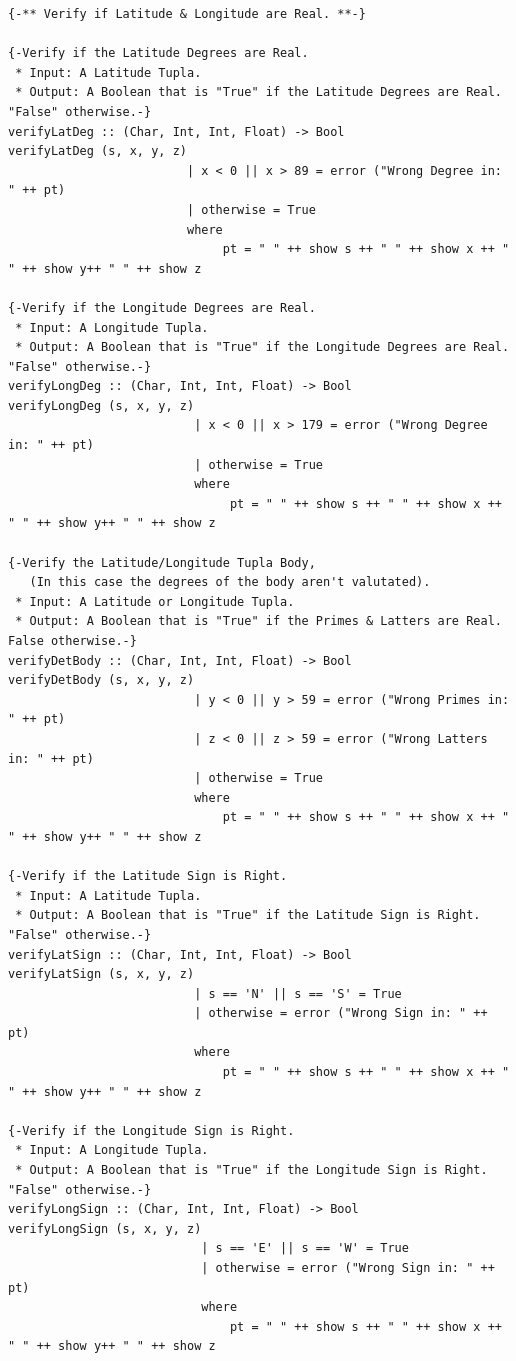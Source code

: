 \documentclass{article}
\begin{document}
\begin{lstlisting}
{-** Verify if Latitude & Longitude are Real. **-}

{-Verify if the Latitude Degrees are Real.
 * Input: A Latitude Tupla.
 * Output: A Boolean that is "True" if the Latitude Degrees are Real. "False" otherwise.-}
verifyLatDeg :: (Char, Int, Int, Float) -> Bool 
verifyLatDeg (s, x, y, z)
                         | x < 0 || x > 89 = error ("Wrong Degree in: " ++ pt)
                         | otherwise = True
                         where
                              pt = " " ++ show s ++ " " ++ show x ++ " " ++ show y++ " " ++ show z

{-Verify if the Longitude Degrees are Real.
 * Input: A Longitude Tupla.
 * Output: A Boolean that is "True" if the Longitude Degrees are Real. "False" otherwise.-}
verifyLongDeg :: (Char, Int, Int, Float) -> Bool 
verifyLongDeg (s, x, y, z)
                          | x < 0 || x > 179 = error ("Wrong Degree in: " ++ pt)
                          | otherwise = True
                          where
                               pt = " " ++ show s ++ " " ++ show x ++ " " ++ show y++ " " ++ show z

{-Verify the Latitude/Longitude Tupla Body,
   (In this case the degrees of the body aren't valutated).
 * Input: A Latitude or Longitude Tupla.
 * Output: A Boolean that is "True" if the Primes & Latters are Real. False otherwise.-}
verifyDetBody :: (Char, Int, Int, Float) -> Bool
verifyDetBody (s, x, y, z)
                          | y < 0 || y > 59 = error ("Wrong Primes in: " ++ pt)
                          | z < 0 || z > 59 = error ("Wrong Latters in: " ++ pt)
                          | otherwise = True 
                          where
                              pt = " " ++ show s ++ " " ++ show x ++ " " ++ show y++ " " ++ show z

{-Verify if the Latitude Sign is Right.
 * Input: A Latitude Tupla.
 * Output: A Boolean that is "True" if the Latitude Sign is Right. "False" otherwise.-}
verifyLatSign :: (Char, Int, Int, Float) -> Bool 
verifyLatSign (s, x, y, z)
                          | s == 'N' || s == 'S' = True
                          | otherwise = error ("Wrong Sign in: " ++ pt)
                          where 
                              pt = " " ++ show s ++ " " ++ show x ++ " " ++ show y++ " " ++ show z

{-Verify if the Longitude Sign is Right.
 * Input: A Longitude Tupla.
 * Output: A Boolean that is "True" if the Longitude Sign is Right. "False" otherwise.-}
verifyLongSign :: (Char, Int, Int, Float) -> Bool 
verifyLongSign (s, x, y, z)
                           | s == 'E' || s == 'W' = True
                           | otherwise = error ("Wrong Sign in: " ++ pt)
                           where 
                               pt = " " ++ show s ++ " " ++ show x ++ " " ++ show y++ " " ++ show z


\end{lstlisting}
\end{document}
